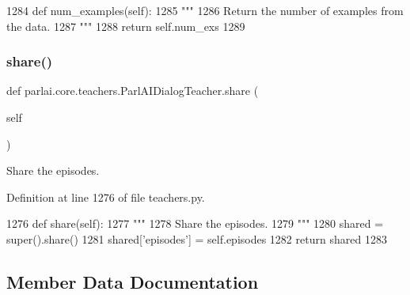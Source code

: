 \begin{DoxyCode}
1284     \textcolor{keyword}{def }num\_examples(self):
1285         \textcolor{stringliteral}{"""}
1286 \textcolor{stringliteral}{        Return the number of examples from the data.}
1287 \textcolor{stringliteral}{        """}
1288         \textcolor{keywordflow}{return} self.num\_exs
1289 
\end{DoxyCode}
\mbox{\label{classparlai_1_1core_1_1teachers_1_1ParlAIDialogTeacher_a9e2eabf923a38b53865705786e07f461}} 
\subsubsection{\texorpdfstring{share()}{share()}}
{\footnotesize\ttfamily def parlai.\+core.\+teachers.\+Parl\+A\+I\+Dialog\+Teacher.\+share (\begin{DoxyParamCaption}\item[{}]{self }\end{DoxyParamCaption})}

\begin{DoxyVerb}Share the episodes.
\end{DoxyVerb}
 

Definition at line 1276 of file teachers.\+py.


\begin{DoxyCode}
1276     \textcolor{keyword}{def }share(self):
1277         \textcolor{stringliteral}{"""}
1278 \textcolor{stringliteral}{        Share the episodes.}
1279 \textcolor{stringliteral}{        """}
1280         shared = super().share()
1281         shared[\textcolor{stringliteral}{'episodes'}] = self.episodes
1282         \textcolor{keywordflow}{return} shared
1283 
\end{DoxyCode}


\subsection{Member Data Documentation}
\mbox{\label{classparlai_1_1core_1_1teachers_1_1ParlAIDialogTeacher_a99d92211286cdcc382f723ebc9d272c4}} 
